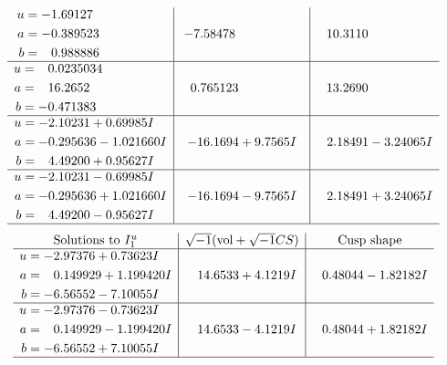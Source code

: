 \documentclass[1p]{elsarticle_modified}
\theoremstyle{definition}
\newcommand{\I}{\sqrt{-1}}
\begin{document}
$$\begin{array}{c|c|c}
\begin{aligned}
u &= -1.69127\phantom{ +0.000000I} \\
a &= -0.389523\phantom{ +0.000000I} \\
b &= \phantom{-}0.988886\phantom{ +0.000000I}\end{aligned}
 & -7.58478\phantom{ +0.000000I} & \phantom{-}10.3110\phantom{ +0.000000I} \\ \hline\begin{aligned}
u &= \phantom{-}0.0235034\phantom{ +0.000000I} \\
a &= \phantom{-}16.2652\phantom{ +0.000000I} \\
b &= -0.471383\phantom{ +0.000000I}\end{aligned}
 & \phantom{-}0.765123\phantom{ +0.000000I} & \phantom{-}13.2690\phantom{ +0.000000I} \\ \hline\begin{aligned}
u &= -2.10231 + 0.69985 I \\
a &= -0.295636 - 1.021660 I \\
b &= \phantom{-}4.49200 + 0.95627 I\end{aligned}
 & -16.1694 + 9.7565 I & \phantom{-}2.18491 - 3.24065 I \\ \hline\begin{aligned}
u &= -2.10231 - 0.69985 I \\
a &= -0.295636 + 1.021660 I \\
b &= \phantom{-}4.49200 - 0.95627 I\end{aligned}
 & -16.1694 - 9.7565 I & \phantom{-}2.18491 + 3.24065 I\\
 \hline 
 \end{array}$$\newpage$$\begin{array}{c|c|c}  
\text{Solutions to }I^u_{1}& \I (\text{vol} + \sqrt{-1}CS) & \text{Cusp shape}\\
 \hline 
\begin{aligned}
u &= -2.97376 + 0.73623 I \\
a &= \phantom{-}0.149929 + 1.199420 I \\
b &= -6.56552 - 7.10055 I\end{aligned}
 & \phantom{-}14.6533 + 4.1219 I & \phantom{-}0.48044 - 1.82182 I \\ \hline\begin{aligned}
u &= -2.97376 - 0.73623 I \\
a &= \phantom{-}0.149929 - 1.199420 I \\
b &= -6.56552 + 7.10055 I\end{aligned}
 & \phantom{-}14.6533 - 4.1219 I & \phantom{-}0.48044 + 1.82182 I\\
 \hline 
 \end{array}$$\newpage\newpage\renewcommand{\arraystretch}{1}
\end{document}
